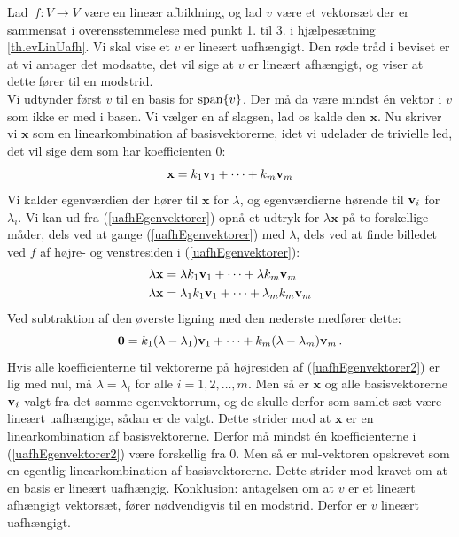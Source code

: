 \begin{bevis}
Lad $\,f:V\rightarrow V$ være en lineær afbildning, og lad $v$ være et vektorsæt der er sammensat i overensstemmelese med punkt 1. til 3. i hjælpesætning \ref{th.evLinUafh}. Vi skal vise et $v$ er lineært uafhængigt. Den røde tråd i beviset er at vi antager det modsatte, det vil sige at $v$ er lineært afhængigt, og viser at dette fører til en modstrid.\\

Vi udtynder først $v$ til en basis for $ \mathrm{span}\{v\} $. Der må da være mindst én vektor i $v$ som ikke er med i basen. Vi vælger en af slagsen, lad os kalde den $\mathbf x$. Nu skriver vi $\mathbf x$ som en linearkombination af basisvektorerne, idet vi  udelader de trivielle led, det vil sige dem som har koefficienten $0$:
\begin{equation}\label{uafhEgenvektorer}
\mathbf x=k_1\mathbf{v}_1+\cdots+k_m\mathbf{v}_m
\end{equation}
Vi kalder egenværdien der hører til $\mathbf x$ for $\lambda$, og egenværdierne hørende til $\mathbf{v}_i$ for $\lambda_i$. Vi kan ud fra (\ref{uafhEgenvektorer}) opnå et udtryk for $\lambda\mathbf x$ på to forskellige måder, dels ved at gange (\ref{uafhEgenvektorer}) med  $\lambda$, dels ved at finde billedet ved $f$ af højre- og venstresiden i (\ref{uafhEgenvektorer}):
\begin{align*}
\lambda\mathbf x &=\lambda k_1\mathbf{v}_1+\cdots+\lambda k_m\mathbf{v}_m\\
\lambda\mathbf x &=\lambda_1 k_1\mathbf{v}_1+\cdots+\lambda_m k_m\mathbf{v}_m
\end{align*}
Ved subtraktion af den øverste ligning med den nederste medfører dette:
\begin{equation}\label{uafhEgenvektorer2}
\bm{0}=k_1(\lambda-\lambda_1)\mathbf{v}_1+\cdots+k_m(\lambda-\lambda_m)\mathbf{v}_m\,.
\end{equation}
Hvis alle koefficienterne til vektorerne på højresiden af (\ref{uafhEgenvektorer2}) er lig med nul, må $\lambda=\lambda_i$ for alle $i=1,2,\ldots, m$. Men så er $\mathbf x$ og alle basisvektorerne $\mathbf{v}_i$ valgt fra det samme egenvektorrum, og de skulle derfor som samlet sæt være lineært uafhængige, sådan er de valgt. Dette strider mod at $\mathbf x$ er en linearkombination af basisvektorerne.\bs
Derfor må mindst én koefficienterne i (\ref{uafhEgenvektorer2}) være forskellig fra 0. Men så er nul-vektoren opskrevet som en egentlig linearkombination af basisvektorerne. Dette strider mod kravet om at en basis er lineært uafhængig.\bs
Konklusion: antagelsen om at $v$ er et lineært afhængigt vektorsæt, fører nødvendigvis til en modstrid. Derfor er $v$ lineært uafhængigt.
\end{bevis}

